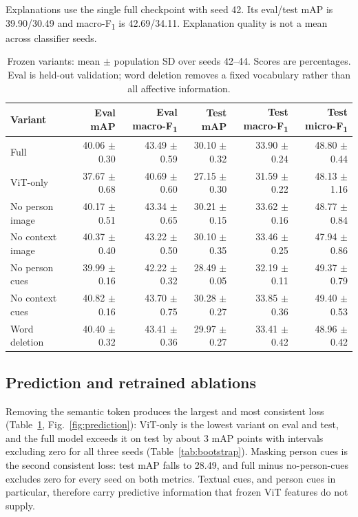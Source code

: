 \documentclass[conference]{IEEEtran}
\newcommand{\mf}{macro-F\textsubscript{1}}
\newcommand{\mi}{micro-F\textsubscript{1}}
\newcommand{\tablegap}{\setlength{\tabcolsep}{4pt}}
\begin{document}
Explanations use the single full checkpoint with seed 42. Its eval/test mAP is 39.90/30.49 and \mf{} is 42.69/34.11. Explanation quality is not a mean across classifier seeds.

\begin{table}[t]
\centering
\caption{Frozen variants: mean $\pm$ population SD over seeds 42--44. Scores are percentages. Eval is held-out validation; word deletion removes a fixed vocabulary rather than all affective information.}
\label{tab:variants}
\small
\tablegap
\begin{tabular}{lrrrrr}
\toprule
Variant & Eval mAP & Eval \mf{} & Test mAP & Test \mf{} & Test \mi{} \\
\midrule
Full & 40.06 $\pm$ 0.30 & 43.49 $\pm$ 0.59 & 30.10 $\pm$ 0.32 & 33.90 $\pm$ 0.24 & 48.80 $\pm$ 0.44 \\
ViT-only & 37.67 $\pm$ 0.68 & 40.69 $\pm$ 0.60 & 27.15 $\pm$ 0.30 & 31.59 $\pm$ 0.22 & 48.13 $\pm$ 1.16 \\
No person image & 40.17 $\pm$ 0.51 & 43.34 $\pm$ 0.65 & 30.21 $\pm$ 0.15 & 33.62 $\pm$ 0.16 & 48.77 $\pm$ 0.84 \\
No context image & 40.37 $\pm$ 0.40 & 43.22 $\pm$ 0.50 & 30.10 $\pm$ 0.35 & 33.46 $\pm$ 0.25 & 47.94 $\pm$ 0.86 \\
No person cues & 39.99 $\pm$ 0.16 & 42.22 $\pm$ 0.32 & 28.49 $\pm$ 0.05 & 32.19 $\pm$ 0.11 & 49.37 $\pm$ 0.79 \\
No context cues & 40.82 $\pm$ 0.16 & 43.70 $\pm$ 0.75 & 30.28 $\pm$ 0.27 & 33.85 $\pm$ 0.36 & 49.40 $\pm$ 0.53 \\
Word deletion & 40.40 $\pm$ 0.32 & 43.41 $\pm$ 0.36 & 29.97 $\pm$ 0.27 & 33.41 $\pm$ 0.42 & 48.96 $\pm$ 0.42 \\
\bottomrule
\end{tabular}
\end{table}

\subsection{Prediction and retrained ablations}\label{sec:prediction}
Removing the semantic token produces the largest and most consistent loss (Table~\ref{tab:variants}, Fig.~\ref{fig:prediction}): ViT-only is the lowest variant on eval and test, and the full model exceeds it on test by about 3 mAP points with intervals excluding zero for all three seeds (Table~\ref{tab:bootstrap}). Masking person cues is the second consistent loss: test mAP falls to 28.49, and full minus no-person-cues excludes zero for every seed on both metrics. Textual cues, and person cues in particular, therefore carry predictive information that frozen ViT features do not supply.
\end{document}
